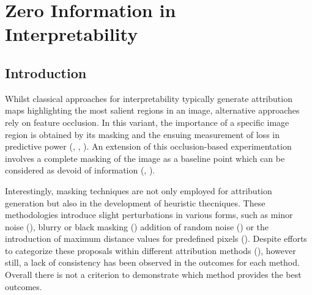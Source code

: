 \chapter{Zero Information in Interpretability}
\chaptertoc{}
\label{ch:zip}
\section{Introduction}
\noindent Whilst classical approaches for interpretability typically generate attribution maps 
highlighting the most salient regions in an image, alternative approaches  rely on 
feature occlusion. In this variant, the importance of a specific image region is obtained by 
its masking and the ensuing measurement of loss in predictive power (\cite{ribeiro2016should}, 
\cite{dabkowski2017real}, \cite{ablationcam}). An extension of this occlusion-based experimentation
involves a complete masking of the image as a baseline point which can be considered as devoid of 
information (\cite{shrikumar2017just}, \cite{shrikumar2019learning}).

\noindent Interestingly, masking techniques are not only employed for attribution generation but also 
in the development of heuristic thecniques. These methodologies introduce slight perturbations in 
various forms, such as minor noise (\cite{hsieh2021evaluations}), blurry or black masking 
(\cite{petsiuk2018rise}) addition of random noise (\cite{haug2021baselines}) or the introduction 
of maximum distance values for predefined pixels (\cite{sturmfels2020visualizing}). 
Despite efforts to categorize these proposals within different attribution methods 
(\cite{kindermans2017unreliability}), however still, a lack of consistency has been observed in 
the outcomes for each method. Overall there is not a criterion to demonstrate which method provides 
the best outcomes.

